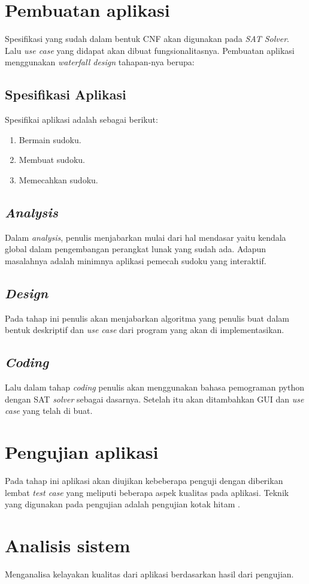 \section{Pembuatan aplikasi}

Spesifikasi yang sudah dalam bentuk CNF akan digunakan pada \textit{SAT Solver}. Lalu \textit{use case} yang didapat akan dibuat fungsionalitasnya. Pembuatan aplikasi menggunakan \textit{waterfall design} tahapan-nya berupa:

\subsection{Spesifikasi Aplikasi}

Spesifikai aplikasi adalah sebagai berikut:
\begin{enumerate}
	\item Bermain sudoku.
	\item Membuat sudoku.
	\item Memecahkan sudoku.
\end{enumerate}

\subsection{\textit{Analysis}}

Dalam \textit{analysis}, penulis menjabarkan mulai dari hal
mendasar yaitu kendala global dalam pengembangan perangkat lunak yang sudah ada. Adapun masalahnya adalah minimnya aplikasi pemecah sudoku yang interaktif.

\subsection{\textit{Design}}

Pada tahap ini penulis akan menjabarkan algoritma yang
penulis buat dalam bentuk deskriptif dan \textit{use case} dari program yang akan di implementasikan. 

\subsection{\textit{Coding}}

Lalu dalam tahap \textit{coding} penulis akan menggunakan
bahasa pemograman python dengan SAT \textit{solver} \cite{SATPy2} sebagai dasarnya. Setelah itu akan ditambahkan GUI dan \textit{use case} yang telah di buat.

\section{Pengujian aplikasi}

Pada tahap ini aplikasi akan diujikan kebeberapa penguji dengan diberikan lembat \textit{test case} yang meliputi beberapa aspek kualitas pada aplikasi. Teknik yang digunakan pada pengujian adalah pengujian kotak hitam \cite{TEST1}.

\section{Analisis sistem}

Menganalisa kelayakan kualitas dari aplikasi berdasarkan hasil dari pengujian.